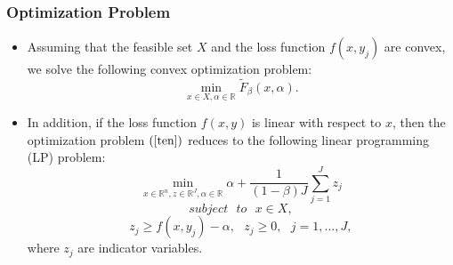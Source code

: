 \documentclass[pdf,10pt,xcolor=dvipsnames,hide notes]{beamer}
\begin{document}
\begin{frame}[label=frame2b8]
	\frametitle{Optimization Problem}
	
	\begin{itemize}
		\justifying
		
		\item Assuming that the feasible set $X$ and the loss
		function $f(x,y_{j})$ are convex, we solve the following convex optimization problem:
		\begin{equation}
		\underset{x\in X,\alpha \in
			\mathbb{R}
		}{\min }\widetilde{F}_{\beta }\left( x,\alpha \right) .  \label{ten}
		\end{equation}
		
		\vspace{0.3cm}
		
		\item In addition, if the loss function $f(x,y)$ is linear with respect to
		\thinspace $x$, then the optimization problem $\left( \ref{ten}\right) $
		reduces to the following linear programming (LP) problem:%
		\begin{equation}
		\underset{x\in
			\mathbb{R}
			^{n},z\in
			\mathbb{R}
			^{J},\alpha \in
			\mathbb{R}
		}{\min }\alpha +\frac{1}{\left( 1-\beta \right) J}\sum_{j=1}^{J}z_{j}
		\label{eleven}
		\end{equation}%
		\begin{equation}
		subject\text{ } to\text{ }x\in X,  \label{12}
		\end{equation}
		\begin{equation}
		z_{j}\geq f(x,y_{j})-\alpha ,\text{ }z_{j}\geq 0,\text{ }j=1,...,J,
		\label{13}
		\end{equation}
		where $z_{j}$ are indicator variables. 
		
	\end{itemize}
	
\end{frame}
\end{document}
